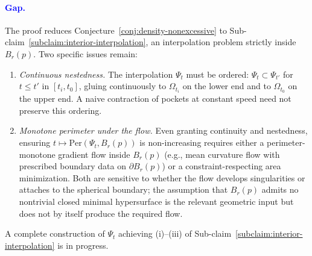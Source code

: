 \paragraph{\textcolor{blue}{Gap.}}
The proof reduces Conjecture~\ref{conj:density-nonexcessive} to Sub-claim~\ref{subclaim:interior-interpolation}, an interpolation problem strictly inside $B_r(p)$. Two specific issues remain:
\begin{enumerate}[label=\textup{(\roman*)}, leftmargin=2em]
    \item \emph{Continuous nestedness.} The interpolation $\Psi_t$ must be ordered: $\Psi_t \subset \Psi_{t'}$ for $t \le t'$ in $[t_i, t_0]$, gluing continuously to $\Omega_{t_i}$ on the lower end and to $\Omega_{t_0}$ on the upper end. A naive contraction of pockets at constant speed need not preserve this ordering.
    \item \emph{Monotone perimeter under the flow.} Even granting continuity and nestedness, ensuring $t \mapsto \mathrm{Per}(\Psi_t, B_r(p))$ is non-increasing requires either a perimeter-monotone gradient flow inside $B_r(p)$ (e.g., mean curvature flow with prescribed boundary data on $\partial B_r(p)$) or a constraint-respecting area minimization. Both are sensitive to whether the flow develops singularities or attaches to the spherical boundary; the assumption that $B_r(p)$ admits no nontrivial closed minimal hypersurface is the relevant geometric input but does not by itself produce the required flow.
\end{enumerate}
A complete construction of $\Psi_t$ achieving (i)--(iii) of Sub-claim~\ref{subclaim:interior-interpolation} is in progress.
\endgroup
